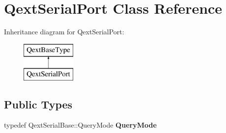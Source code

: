 \hypertarget{class_qext_serial_port}{}\section{Qext\+Serial\+Port Class Reference}
\label{class_qext_serial_port}
Inheritance diagram for Qext\+Serial\+Port\+:\begin{figure}[H]
\begin{center}
\leavevmode
\includegraphics[height=2.000000cm]{class_qext_serial_port}
\end{center}
\end{figure}
\subsection*{Public Types}
\begin{DoxyCompactItemize}
\item 
\mbox{\label{class_qext_serial_port_a211f50c9fa3b22235b2dbfa0126c125a}} 
typedef Qext\+Serial\+Base\+::\+Query\+Mode {\bfseries Query\+Mode}
\end{DoxyCompactItemize}
